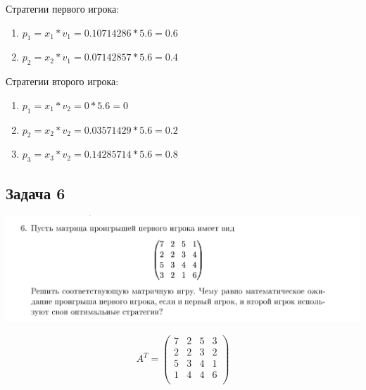 \documentclass[9pt, a4paper]{article}
\begin{document}
    Стратегии первого игрока:
    \begin{enumerate}
        \item $p_1 = x_1 * v_1 = 0.10714286 * 5.6 = 0.6$
        \item $p_2 = x_2 * v_1 = 0.07142857 * 5.6 = 0.4$
    \end{enumerate}

    Стратегии второго игрока:
    \begin{enumerate}
        \item $p_1 = x_1 * v_2 = 0 * 5.6 = 0$
        \item $p_2 = x_2 * v_2 = 0.03571429 * 5.6 = 0.2$
        \item $p_3 = x_3 * v_2 = 0.14285714 * 5.6 = 0.8$
    \end{enumerate}

    \newpage

    \subsection{Задача 6}\label{subsec:task6}
    \includegraphics[width=1\textwidth]{docs/6}

    \begin{equation}
        A^T =
        \begin{pmatrix}
            7 & 2 & 5 & 3 \\
            2 & 2 & 3 & 2 \\
            5 & 3 & 4 & 1 \\
            1 & 4 & 4 & 6 \\
        \end{pmatrix}\label{eq:equation33}
    \end{equation}
\end{document}
